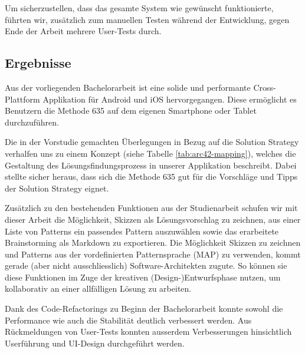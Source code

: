 Um sicherzustellen, dass das gesamte System wie gewünscht funktionierte, führten wir, zusätzlich zum manuellen Testen während der Entwicklung, gegen Ende der Arbeit mehrere User-Tests durch.

\subsection{Ergebnisse}
Aus der vorliegenden Bachelorarbeit ist eine solide und performante Cross-Plattform Applikation für Android und iOS hervorgegangen. Diese ermöglicht es Benutzern die Methode 635 auf dem eigenen Smartphone oder Tablet durchzuführen.

Die in der Vorstudie gemachten Überlegungen in Bezug auf die Solution Strategy verhalfen uns zu einem Konzept (siehe Tabelle \ref{tab:arc42-mapping}), welches die Gestaltung des Lösungs\-findungs\-prozess in unserer Applikation beschreibt. Dabei stellte sicher heraus, dass sich die Methode 635 gut für die Vorschläge und Tipps der Solution Strategy eignet. 

Zusätzlich zu den bestehenden Funktionen aus der Studienarbeit schufen wir mit dieser Arbeit die Möglichkeit, Skizzen als Lösungsvorschlag zu zeichnen, aus einer Liste von Patterns ein passendes Pattern auszuwählen sowie das erarbeitete Brainstorming als Markdown zu exportieren. Die Möglichkeit Skizzen zu zeichnen und Patterns aus der vordefinierten Patternsprache (MAP) zu verwenden, kommt gerade (aber nicht ausschliesslich) Software-Architekten zugute. So können sie diese Funktionen im Zuge der kreativen (Design-)Entwurfsphase nutzen, um kollaborativ an einer allfälligen Lösung zu arbeiten.

Dank des Code-Refactorings zu Beginn der Bachelorarbeit konnte sowohl die Performance wie auch die Stabilität deutlich verbessert werden. Aus Rückmeldungen von User-Tests konnten ausserdem Verbesserungen hinsichtlich Userführung und UI-Design durchgeführt werden.